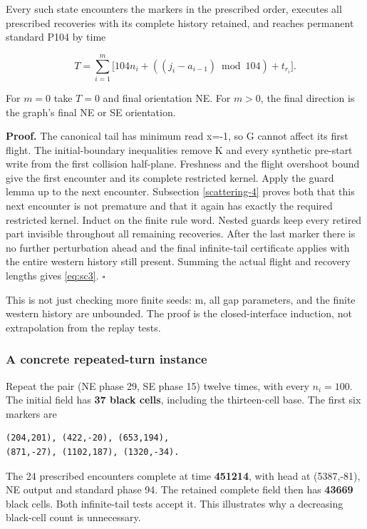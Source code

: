 \begin{theorem}\label{th:scattering-train} Every such state
encounters the markers in the prescribed order, executes all prescribed
recoveries with its complete history retained, and reaches permanent
standard P104 by time

\begin{equation}\label{eq:sc3}
T=\sum_{i=1}^m\bigl[104n_i+((j_i-a_{i-1})\bmod104)+t_{r_i}\bigr].
\end{equation}

For $m=0$ take $T=0$ and final orientation NE. For $m>0$, the final
direction is the graph's final NE or SE orientation.
\end{theorem}

\textbf{Proof.} The canonical tail has minimum read x=-1, so G cannot
affect its first flight. The initial-boundary inequalities remove K and
every synthetic pre-start write from the first collision half-plane.
Freshness and the flight overshoot bound give the first encounter and
its complete restricted kernel. Apply the guard lemma up to the next
encounter. Subsection \ref{scattering-4} proves both that this next
encounter is not premature and that it again has exactly the required
restricted kernel. Induct on the finite rule word. Nested guards keep
every retired part invisible throughout all remaining recoveries. After
the last marker there is no further perturbation ahead and the final
infinite-tail certificate applies with the entire western history still
present. Summing the actual flight and recovery lengths gives \eqref{eq:sc3}.
\(\square\)

This is not just checking more finite seeds: m, all gap parameters, and
the finite western history are unbounded. The proof is the
closed-interface induction, not extrapolation from the replay tests.

\subsubsection{A concrete repeated-turn
instance}\label{a-concrete-repeated-turn-instance}

Repeat the pair (NE phase 29, SE phase 15) twelve times, with every
$n_i=100$. The initial field has \textbf{37 black cells}, including the
thirteen-cell base. The first six markers are

\begin{lstlisting}
(204,201), (422,-20), (653,194),
(871,-27), (1102,187), (1320,-34).
\end{lstlisting}

The 24 prescribed encounters complete at time \textbf{451214}, with head
at (5387,-81), NE output and standard phase 94. The retained complete
field then has \textbf{43669} black cells. Both infinite-tail tests
accept it. This illustrates why a decreasing black-cell count is unnecessary.
